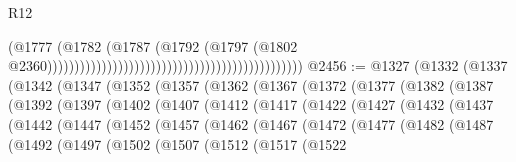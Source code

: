 \begin{lexlean}{R12}
\begin{coremodule}
{{{{{{{{{{{{{{{{{{{{{{{{{{{{{{{{{{{{{{{{{{{{{{{{{{{{{{{{{{{{{{{{{{{{{{{{{{{{{{{{{{{{{{{{{{{{{{{{{{{{{{{{{{                                                                                      (@1777
                                                                                        (@1782
                                                                                          (@1787
                                                                                            (@1792
                                                                                              (@1797
                                                                                                (@1802
                                                                                                  @2360)))))))))))))))))))))))))))))))))))))))))))))))
@2456 := @1327
    (@1332
      (@1337
        (@1342
          (@1347
            (@1352
              (@1357
                (@1362
                  (@1367
                    (@1372
                      (@1377
                        (@1382
                          (@1387
                            (@1392
                              (@1397
                                (@1402
                                  (@1407
                                    (@1412
                                      (@1417
                                        (@1422
                                          (@1427
                                            (@1432
                                              (@1437
                                                (@1442
                                                  (@1447
                                                    (@1452
                                                      (@1457
                                                        (@1462
                                                          (@1467
                                                            (@1472
                                                              (@1477
                                                                (@1482
                                                                  (@1487
                                                                    (@1492
                                                                      (@1497
                                                                        (@1502
                                                                          (@1507
                                                                            (@1512
                                                                              (@1517
                                                                                (@1522
}}}}}}}}}}}}}}}}}}}}}}}}}}}}}}}}}}}}}}}}}}}}}}}}}}}}}}}}}}}}}}}}}}}}}}}}}}}}}}}}}}}}}}}}}}}}}}}}}}}}}}}}}}
\end{coremodule}
\end{lexlean}
